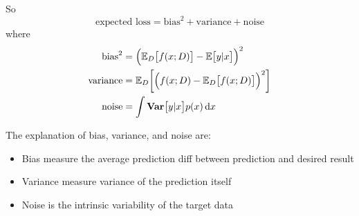 So 
\begin{equation}
    \text{expected loss} = \text{bias}^2 + \text{variance} + \text{noise}
\end{equation}
where
\begin{equation}
    \begin{aligned}
        \text{bias}^2 &= \mleft(\expectationonanvariable{D}{f(x;D)} - \expectation{y|x}\mright)^2 \\
        \text{variance} &= \expectationonanvariable{D}{\mleft(f(x;D) - \expectationonanvariable{D}{f(x;D)}\mright)^2} \\
        \text{noise} &= \int \variance{y|x} p(x) \dif x
    \end{aligned}
\end{equation}

The explanation of bias, variance, and noise are:
\begin{itemize}
    \item Bias measure the average prediction diff between prediction and desired result
    \item Variance measure variance of the prediction itself
    \item Noise is the intrinsic variability of the target data
\end{itemize}

